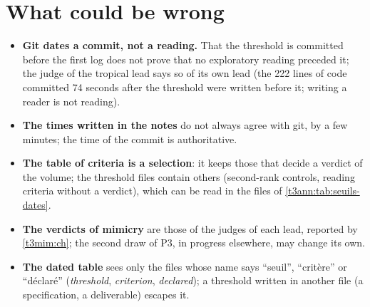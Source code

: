 \section{What could be wrong}\label{t3ann:sec:faux-a}

\begin{faux}
\begin{itemize}
\item \textbf{Git dates a commit, not a reading.} That the threshold is committed before the first log does not prove that no exploratory reading preceded it; the judge of the tropical lead says so of its own lead (the 222 lines of code committed 74 seconds after the threshold were written before it; writing a reader is not reading).
\item \textbf{The times written in the notes} do not always agree with git, by a few minutes; the time of the commit is authoritative.
\item \textbf{The table of criteria is a selection}: it keeps those that decide a verdict of the volume; the threshold files contain others (second-rank controls, reading criteria without a verdict), which can be read in the files of \cref{t3ann:tab:seuils-dates}.
\item \textbf{The verdicts of mimicry} are those of the judges of each lead, reported by \cref{t3mim:ch}; the second draw of P3, in progress elsewhere, may change its own.
\item \textbf{The dated table} sees only the files whose name says ``seuil'', ``critère'' or ``déclaré'' (\emph{threshold}, \emph{criterion}, \emph{declared}); a threshold written in another file (a specification, a deliverable) escapes it.
\end{itemize}
\end{faux}
